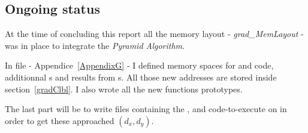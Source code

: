 \subsection{Ongoing status}

At the time of concluding this report all the memory layout - \emph{grad\_MemLayout} - was in place to integrate the \emph{Pyramid Algorithm}.

In  file - Appendice~\ref{AppendixG} - I defined \ram{} memory spaces for  and  code, additionnal \uni{}s and results from \qpu{}s. All those new addresses are stored inside  section~\ref{gradClbl}. I also wrote all the new functions prototypes.

The last part will be to write  files containing the ,  and  code-to-execute on \vc{} in order to get these approached $(d_{x},d_{y})$.

